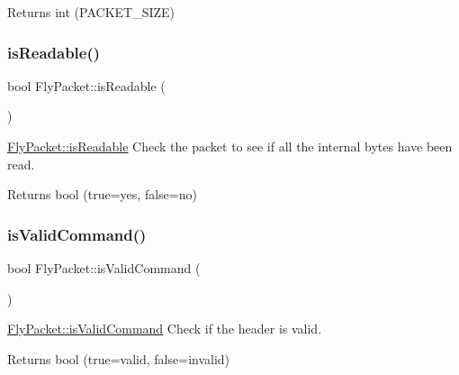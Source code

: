 \begin{DoxyReturn}{Returns}
int (P\+A\+C\+K\+E\+T\+\_\+\+S\+I\+ZE) 
\end{DoxyReturn}
\hypertarget{class_fly_packet_a9c1a141b4b44004015618da46829200d}{}\label{class_fly_packet_a9c1a141b4b44004015618da46829200d} 
\subsubsection{\texorpdfstring{is\+Readable()}{isReadable()}}
{\footnotesize\ttfamily bool Fly\+Packet\+::is\+Readable (\begin{DoxyParamCaption}{ }\end{DoxyParamCaption})}



\hyperlink{class_fly_packet_a9c1a141b4b44004015618da46829200d}{Fly\+Packet\+::is\+Readable} Check the packet to see if all the internal bytes have been read. 

\begin{DoxyReturn}{Returns}
bool (true=yes, false=no) 
\end{DoxyReturn}
\hypertarget{class_fly_packet_a32bdd283c8d5961adb20524a14269224}{}\label{class_fly_packet_a32bdd283c8d5961adb20524a14269224} 
\subsubsection{\texorpdfstring{is\+Valid\+Command()}{isValidCommand()}}
{\footnotesize\ttfamily bool Fly\+Packet\+::is\+Valid\+Command (\begin{DoxyParamCaption}{ }\end{DoxyParamCaption})}



\hyperlink{class_fly_packet_a32bdd283c8d5961adb20524a14269224}{Fly\+Packet\+::is\+Valid\+Command} Check if the header is valid. 

\begin{DoxyReturn}{Returns}
bool (true=valid, false=invalid) 
\end{DoxyReturn}
\hypertarget{class_fly_packet_a71175af24ccf498579c804aa21500db5}{}\label{class_fly_packet_a71175af24ccf498579c804aa21500db5} 
